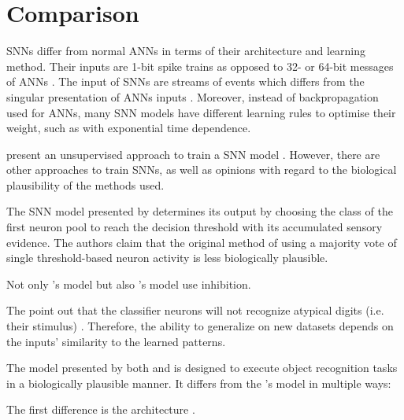 \section{Comparison}
\label{sec:comparison}

\acp{SNN} differ from normal \acp{ANN} in terms of their architecture and learning method.
Their inputs are 1-bit spike trains as opposed to 32- or 64-bit messages of \acp{ANN} \cite{SNN}.
The input of \acp{SNN} are streams of events which differs from the singular presentation of \acp{ANN} inputs \cite{ANN_SNN_conversion}.
Moreover, instead of backpropagation used for \acp{ANN}, many \ac{SNN} models have different learning rules to optimise their weight, 
such as  with exponential time dependence.

\authorsSNN{} present an unsupervised approach to train a \ac{SNN} model \cite{SNN}.
However, there are other approaches to train \acp{SNN}, as well as opinions with regard to the biological plausibility of the methods used.


The \ac{SNN} model presented by \authorsSTDPlike{} \cite{STDP_like} determines its output by 
choosing the class of the first neuron pool to reach the decision threshold with its accumulated sensory evidence.
The authors claim that the original method of using a majority vote of single threshold-based neuron activity is less biologically plausible.

Not only \authorsSTDPlike{}'s model \cite{STDP_like} but also \authorsSNN{}'s model \cite{SNN} use inhibition.

The \authorsSTDPlike{} point out that the classifier neurons will not recognize atypical digits (i.e. their stimulus) \cite{STDP_like}.
Therefore, the ability to generalize on new datasets depends on the inputs' similarity to the learned patterns.


The model presented by both \authorsmultiScaleSTDP{} \cite{multi_scale_STDP} and \authorsSTDPvisFeat{} \cite{STDP_vis_feat} 
is designed to execute object recognition tasks in a biologically plausible manner.
It differs from the \authorsSNN{}'s model \cite{SNN} in multiple ways:

The first difference is the architecture \cite{multi_scale_STDP,STDP_vis_feat}.

